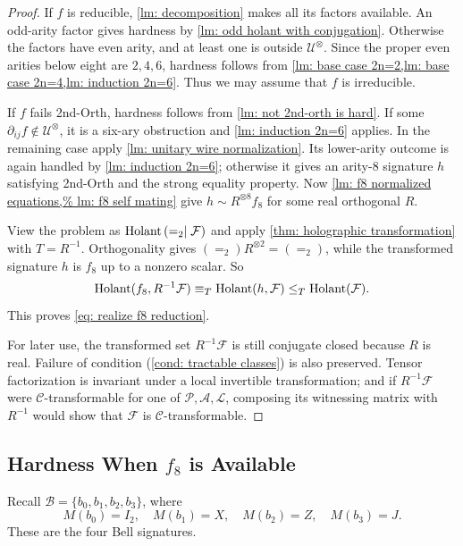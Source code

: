 \begin{proof}
If $f$ is reducible, \cref{lm: decomposition} makes all its factors
available.  An odd-arity factor gives hardness by
\cref{lm: odd holant with conjugation}.  Otherwise the factors have even
arity, and at least one is outside $\mathcal U^{\otimes}$.  Since the
proper even arities below eight are $2,4,6$, hardness follows from
\cref{lm: base case 2n=2,lm: base case 2n=4,lm: induction 2n=6}.
Thus we may assume that $f$ is irreducible.

If $f$ fails {\sc 2nd-Orth}, hardness follows from
\cref{lm: not 2nd-orth is hard}.  If some
$\partial_{ij}f\notin\mathcal U^{\otimes}$, it is a six-ary obstruction
and \cref{lm: induction 2n=6} applies. 
In the remaining case apply
\cref{lm: unitary wire normalization}.  Its lower-arity outcome is again
handled by \cref{lm: induction 2n=6}; otherwise it gives an arity-$8$
signature $h$ satisfying {\sc 2nd-Orth} and the strong equality property.
Now \cref{lm: f8 normalized equations,%
lm: f8 self mating} give
$h\sim R^{\otimes8}f_8$ for some real orthogonal $R$.

View the problem as $\operatorname{Holant}\left(=_2\mid \mathcal F\right)$ and apply
\cref{thm: holographic transformation} with $T=R^{-1}$.  Orthogonality
gives $(=_2)R^{\otimes2}=(=_2)$, while the transformed signature $h$ is
$f_8$ up to a nonzero scalar.  
So
\[
 \operatorname{Holant}(f_8,R^{-1}\mathcal F)
 \equiv_T\operatorname{Holant}(h,\mathcal F)
 \leq_T\operatorname{Holant}(\mathcal F).
\]
This proves
\eqref{eq: realize f8 reduction}.

For later use, the transformed set $R^{-1}\mathcal F$ is still conjugate
closed because $R$ is real.  Failure of condition
\rm{(\ref{cond: tractable classes})} is also preserved.  Tensor
factorization is invariant under a local invertible transformation; and
if $R^{-1}\mathcal F$ were $\mathscr C$-transformable for one of
$\mathscr P,\mathscr A,\mathscr L$, composing its witnessing matrix with
$R^{-1}$ would show that $\mathcal F$ is $\mathscr C$-transformable.
\end{proof}

\subsection{Hardness When \texorpdfstring{$f_8$}{f8} is Available}
\label{subsec: f8 available hardness}
Recall $\mathcal B=\{b_0, b_1, b_2, b_3\}$, where
\begin{equation}
 M(b_0)=I_2,\quad M(b_1)=X,\quad M(b_2)=Z,\quad M(b_3)=J.
 \label{eq: Bell signature set}
\end{equation}
These are the four Bell signatures.  

